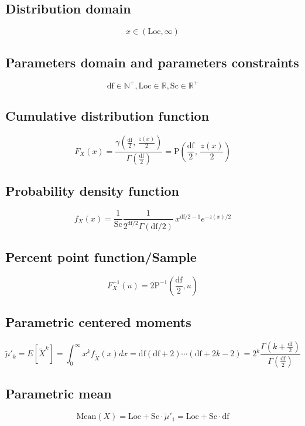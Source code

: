 \documentclass{article}
\begin{document}
\subsection{Distribution domain}
\begin{equation*} x\in\left(\text{Loc},\infty\right) \end{equation*}
\subsection{Parameters domain and parameters constraints}
\begin{equation*} \text{df}\in\mathbb{N}^{+}, \text{Loc}\in\mathbb{R}, \text{Sc}\in\mathbb{R}^{+} \end{equation*}
\subsection{Cumulative distribution function}
\begin{equation*} F_{X}\left(x\right)=\frac{\gamma(\frac{\text{df}}{2},\,\frac{z(x)}{2})}{\Gamma(\frac{\text{df}}{2})}=\text{P}\left(\frac{\text{df}}{2},\,\frac{z(x)}{2}\right) \end{equation*}
\subsection{Probability density function}
\begin{equation*} f_{X}\left(x\right)=\frac{1}{\text{Sc}}\frac{1}{2^{\text{df}/2}\Gamma(\text{df}/2)}\,x^{\text{df}/2-1} e^{-z(x)/2} \end{equation*}
\subsection{Percent point function/Sample}
\begin{equation*} F^{-1}_{X}\left(u\right)=2\text{P}^{-1}\left(\frac{\text{df}}{2},u\right) \end{equation*}
\subsection{Parametric centered moments}
\begin{equation*} \tilde{\mu}'_{k}=E[\tilde{X}^k]=\int_{0}^{\infty}x^{k}f_{\tilde{X}}\left(x\right)dx=\text{df}(\text{df}+2)\cdots(\text{df}+2k-2)=2^k\frac{\Gamma\left(k+\frac{\text{df}}{2}\right)}{\Gamma\left(\frac{\text{df}}{2}\right)} \end{equation*}
\subsection{Parametric mean}
\begin{equation*} \mathrm{Mean}(X)=\text{Loc}+\text{Sc}\cdot\tilde{\mu}'_{1}=\text{Loc}+\text{Sc}\cdot \text{df} \end{equation*}
\end{document}
